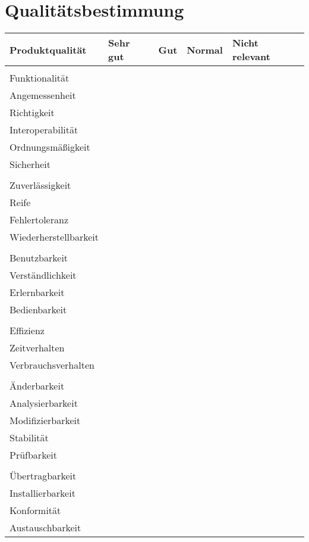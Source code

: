 \documentclass[pflichtenheft.tex]{subfiles}
\begin{document}
\chapter{Qualitätsbestimmung}

\begin{table}
\centering
\begin{tabular}{ | l | l | l | l | l | }
    \hline
    \textbf{Produktqualität} & \textbf{Sehr gut} & \textbf{Gut} & \textbf{Normal} & 
    	\textbf{Nicht relevant}\\ \hline
    &&&& \\
    \Large{Funktionalität}	&  &  &  &  \\    \hline
    Angemessenheit 			&  &  &  &  \\    \hline
    Richtigkeit    			&  &  &  &  \\    \hline
    Interoperabilität   	&  &  &  &  \\    \hline
    Ordnungsmäßigkeit		&  &  &  &  \\    \hline
    Sicherheit				&  &  &  &  \\    \hline
    &&&& \\
    \Large{Zuverlässigkeit}  &  &  &  &  \\    \hline
    Reife					&  &  &  &  \\    \hline
    Fehlertoleranz			&  &  &  &  \\    \hline
    Wiederherstellbarkeit	&  &  &  &  \\    \hline
    &&&& \\
    \Large{Benutzbarkeit}	&  &  &  &  \\    \hline
    Verständlichkeit		&  &  &  &  \\    \hline
    Erlernbarkeit			&  &  &  &  \\    \hline
    Bedienbarkeit			&  &  &  &  \\    \hline
    &&&& \\
    \Large{Effizienz}		&  &  &  &  \\    \hline
    Zeitverhalten			&  &  &  &  \\    \hline
    Verbrauchsverhalten		&  &  &  &  \\    \hline
    &&&& \\
    \Large{Änderbarkeit}	&  &  &  &  \\    \hline
    Analysierbarkeit		&  &  &  &  \\    \hline
    Modifizierbarkeit		&  &  &  &  \\    \hline
    Stabilität				&  &  &  &  \\    \hline
    Prüfbarkeit				&  &  &  &  \\    \hline
    &&&& \\
    \Large{Übertragbarkeit}	&  &  &  &  \\    \hline
    Installierbarkeit		&  &  &  &  \\    \hline
    Konformität				&  &  &  &  \\    \hline
    Austauschbarkeit		&  &  &  &  \\    \hline
    
    
\end{tabular}
\end{table}
\end{document}
